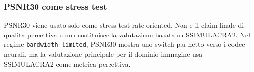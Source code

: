 \subsubsection{PSNR30 come stress test}

PSNR30 viene usato solo come stress test rate-oriented. Non e il claim
finale di qualita percettiva e non sostituisce la valutazione basata su
SSIMULACRA2. Nel regime \texttt{bandwidth\_limited}, PSNR30 mostra uno
switch piu netto verso i codec neurali, ma la valutazione principale per
il dominio immagine usa SSIMULACRA2 come metrica percettiva.
